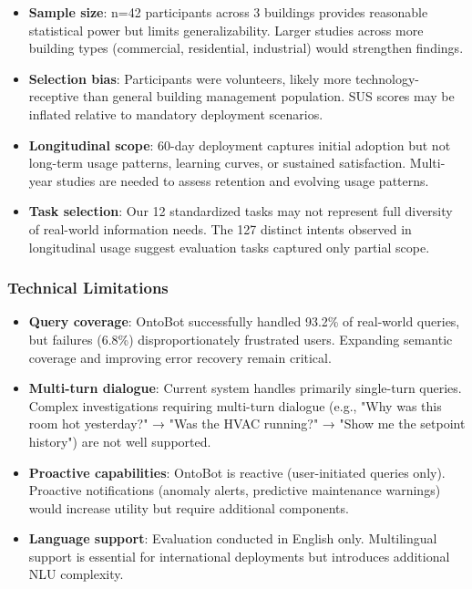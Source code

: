 \documentclass[acmlarge]{acmart}
\begin{document}
\begin{itemize}
    \item \textbf{Sample size}: n=42 participants across 3 buildings provides reasonable statistical power but limits generalizability. Larger studies across more building types (commercial, residential, industrial) would strengthen findings.
    
    \item \textbf{Selection bias}: Participants were volunteers, likely more technology-receptive than general building management population. SUS scores may be inflated relative to mandatory deployment scenarios.
    
    \item \textbf{Longitudinal scope}: 60-day deployment captures initial adoption but not long-term usage patterns, learning curves, or sustained satisfaction. Multi-year studies are needed to assess retention and evolving usage patterns.
    
    \item \textbf{Task selection}: Our 12 standardized tasks may not represent full diversity of real-world information needs. The 127 distinct intents observed in longitudinal usage suggest evaluation tasks captured only partial scope.
\end{itemize}

\subsubsection{Technical Limitations}

\begin{itemize}
    \item \textbf{Query coverage}: OntoBot successfully handled 93.2\% of real-world queries, but failures (6.8\%) disproportionately frustrated users. Expanding semantic coverage and improving error recovery remain critical.
    
    \item \textbf{Multi-turn dialogue}: Current system handles primarily single-turn queries. Complex investigations requiring multi-turn dialogue (e.g., "Why was this room hot yesterday?" → "Was the HVAC running?" → "Show me the setpoint history") are not well supported.
    
    \item \textbf{Proactive capabilities}: OntoBot is reactive (user-initiated queries only). Proactive notifications (anomaly alerts, predictive maintenance warnings) would increase utility but require additional components.
    
    \item \textbf{Language support}: Evaluation conducted in English only. Multilingual support is essential for international deployments but introduces additional NLU complexity.
\end{itemize}
\end{document}
